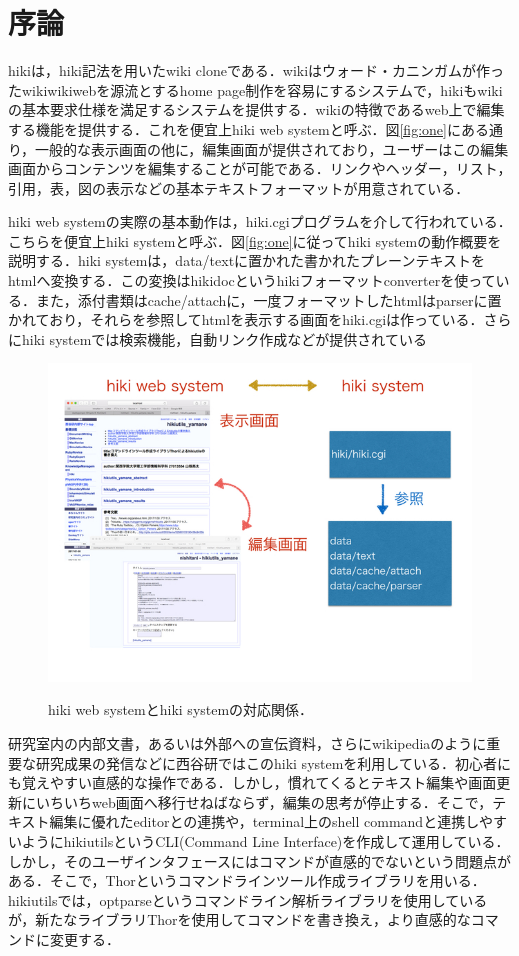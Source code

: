 \section{序論}
hikiは，hiki記法を用いたwiki cloneである．wikiはウォード・カニンガムが作ったwikiwikiwebを源流とするhome page制作を容易にするシステムで，hikiもwikiの基本要求仕様を満足するシステムを提供する．wikiの特徴であるweb上で編集する機能を提供する．これを便宜上hiki web systemと呼ぶ．図\ref{fig:one}にある通り，一般的な表示画面の他に，編集画面が提供されており，ユーザーはこの編集画面からコンテンツを編集することが可能である．リンクやヘッダー，リスト，引用，表，図の表示などの基本テキストフォーマットが用意されている．

hiki web systemの実際の基本動作は，hiki.cgiプログラムを介して行われている．こちらを便宜上hiki systemと呼ぶ．図\ref{fig:one}に従ってhiki systemの動作概要を説明する．hiki systemは，data/textに置かれた書かれたプレーンテキストをhtmlへ変換する．この変換はhikidoc\cite{1-1}というhikiフォーマットconverterを使っている．また，添付書類はcache/attachに，一度フォーマットしたhtmlはparserに置かれており，それらを参照してhtmlを表示する画面をhiki.cgiは作っている．さらにhiki systemでは検索機能，自動リンク作成などが提供されている

\begin{figure}[htbp]\begin{center}
\includegraphics[width=12cm,bb= 0 0 937 753]{../figs/./hikiutils_yamane.001.jpg}
\caption{hiki web systemとhiki systemの対応関係．}
\label{fig:one}
\label{default}\end{center}\end{figure}
研究室内の内部文書，あるいは外部への宣伝資料，さらにwikipediaのように重要な研究成果の発信などに西谷研ではこのhiki systemを利用している．初心者にも覚えやすい直感的な操作である．しかし，慣れてくるとテキスト編集や画面更新にいちいちweb画面へ移行せねばならず，編集の思考が停止する．そこで，テキスト編集に優れたeditorとの連携や，terminal上のshell commandと連携しやすいようにhikiutilsというCLI(Command Line Interface)を作成して運用している．しかし，そのユーザインタフェースにはコマンドが直感的でないという問題点がある．そこで，Thorというコマンドラインツール作成ライブラリを用いる．hikiutilsでは，optparseというコマンドライン解析ライブラリを使用しているが，新たなライブラリThorを使用してコマンドを書き換え，より直感的なコマンドに変更する．

